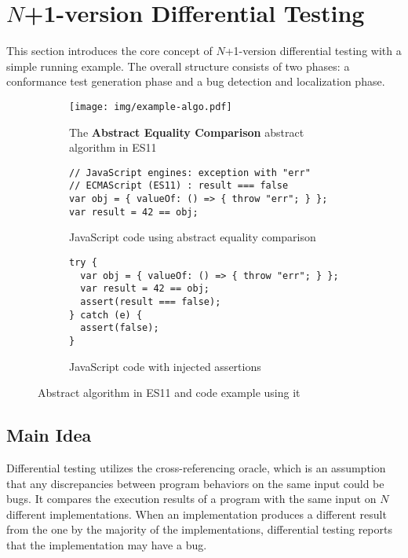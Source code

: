 \section{$N$+1-version Differential Testing}\label{sec:idea}
This section introduces the core concept of $N$+1-version differential testing with a
simple running example.  The overall structure consists of two
phases: a conformance test generation phase and a bug detection and localization
phase.

\begin{figure}[t]
  \centering
  \begin{subfigure}[t]{0.48\textwidth}
    \texttt{[image: img/example-algo.pdf]}
\vspace*{-.5em}
    \caption{The \textbf{Abstract Equality Comparison} abstract algorithm in
    ES11}
    \label{fig:example-algo}
  \end{subfigure}
  \begin{subfigure}[t]{0.43\textwidth}
    \begin{lstlisting}[style=myJSstyle]
// JavaScript engines: exception with "err"
// ECMAScript (ES11) : result === false
var obj = { valueOf: () => { throw "err"; } };
var result = 42 == obj;
    \end{lstlisting}
\vspace*{-.5em}
    \caption{JavaScript code using abstract equality comparison}
    \label{fig:example-js}
  \end{subfigure}
  \begin{subfigure}[t]{0.45\textwidth}
    \begin{lstlisting}[style=myJSstyle]
try {
  var obj = { valueOf: () => { throw "err"; } };
  var result = 42 == obj;
  assert(result === false);
} catch (e) {
  assert(false);
}
    \end{lstlisting}
\vspace*{-1em}
    \caption{JavaScript code with injected assertions}
    \label{fig:example-injected}
  \end{subfigure}
  \caption{Abstract algorithm in ES11 and code example using it}
  \label{fig:example}
  \vspace*{-1em}
\end{figure}


\subsection{Main Idea}

Differential testing utilizes the cross-referencing oracle, which is
an assumption that any discrepancies between program behaviors on the same input
could be bugs.  It compares the execution results of a program with the same
input on $N$ different implementations.  When an implementation produces a different
result from the one by the majority of the implementations, differential testing
reports that the implementation may have a bug.

